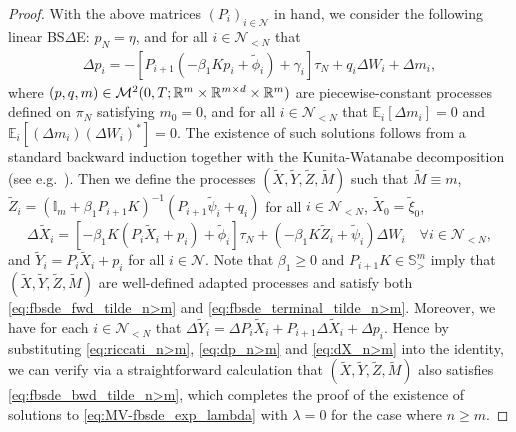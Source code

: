 \documentclass[11pt]{article}
\numberwithin{equation}{section}
\theoremstyle{definition}
\theoremstyle{remark}
\newcommand{\q}{\quad}   \newcommand{\qq}{\qquad}
\def\l{\label}  \def\f{\frac}  \def\fa{\forall}
\def\b{\beta}  \def\a{\alpha} \def\ga{\gamma}
\def\cM{\mathcal{M}}
\def\cN{\mathcal{N}}
\def\sE{{\mathbb{E}}}
\def\sI{{\mathbb{I}}}
\def\sR{{\mathbb R}}
\def\sS{{\mathbb{S}}}
\def\bb{\begin{equation}} \def\ee{\end{equation}}
\begin{document}
\begin{proof}
With the above matrices $(P_i)_{i\in \cN}$ in hand, we consider the following
linear BS$\Delta$E:
$p_N=\eta$, and for all  $i\in \cN_{<N}$ that
\begin{align}\l{eq:dp_n>m}
\Delta p_i=-[P_{i+1}(-\b_1Kp_{i}+\tilde{\phi}_{i})+\gamma_i]\tau_N
+q_i\Delta W_i+\Delta m_i,
\end{align}
where 
 $(p,q,m)\in \cM^2(0,T;\sR^m\t \sR^{m\t d}\t \sR^m)$ are piecewise-constant processes defined on $\pi_N$ satisfying
 $m_0=0$, 
and for all $i\in \cN_{<N}$ that
$\sE_{i}[\Delta m_i] =0$ and  $\sE_{i}[(\Delta m_i)(\Delta W_i)^*] =0$.
The existence of such solutions follows from a standard  backward induction together with the Kunita-Watanabe decomposition (see e.g.~\cite[Theorem 2.2]{bielecki2015}).
Then we define the processes $(\tilde{X},\tilde{Y},\tilde{Z},\tilde{M})$ such that 
$\tilde{M}\equiv m$, 
$\tilde{Z}_i=(\sI_m+\b_1P_{i+1}K)^{-1}(P_{i+1}\tilde{\psi}_i+q_i)$
for all $i\in\cN_{<N}$, 
$\tilde{X}_0=\tilde{\xi}_0$,
\bb\l{eq:dX_n>m}
\Delta \tilde{X}_i=[-\b_1K(P_{i}\tilde{X}_{i}+p_{i})+\tilde{\phi}_{i}]\tau_N
+(-\b_1K\tilde{Z}_i+\tilde{\psi}_i)\Delta W_i
\q \fa i\in \cN_{<N},
\ee
and $\tilde{Y}_i=P_i\tilde{X}_i+p_i$ for all $i\in \cN$.
Note that 
$ \b_1\ge 0$
and $P_{i+1}K\in \sS^m_>$
imply that  $(\tilde{X},\tilde{Y},\tilde{Z},\tilde{M})$ are well-defined adapted processes and satisfy both \eqref{eq:fbsde_fwd_tilde_n>m} and \eqref{eq:fbsde_terminal_tilde_n>m}.
Moreover,
we have for each $i\in \cN_{<N}$ that  
$\Delta \tilde{Y}_i=\Delta P_i\tilde{X}_{i}+ P_{i+1}\Delta \tilde{X}_i+\Delta p_i$.
Hence by substituting   \eqref{eq:riccati_n>m}, \eqref{eq:dp_n>m} and \eqref{eq:dX_n>m}
into the identity, 
we can verify via a straightforward calculation
that 
$(\tilde{X},\tilde{Y},\tilde{Z},\tilde{M})$ also satisfies \eqref{eq:fbsde_bwd_tilde_n>m},
which completes the proof of the  existence of solutions to  \eqref{eq:MV-fbsde_exp_lambda} 
with $\lambda=0$
for the case where $n\ge m$.



\end{proof}
\end{document}
